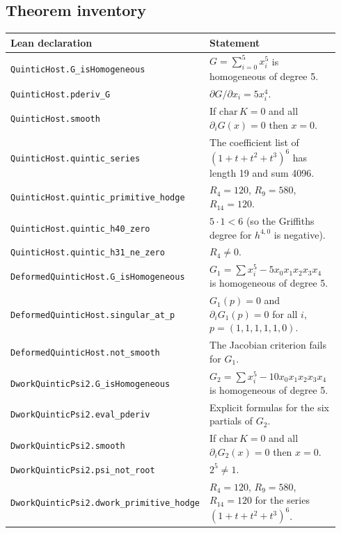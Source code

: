 \documentclass[11pt]{article}
\theoremstyle{definition}\newtheorem{definition}[theorem]{Definition}\newtheorem{remark}[theorem]{Remark}
\begin{document}
\subsection{Theorem inventory}
\begin{center}\small
\begin{longtable}{p{0.42\linewidth}p{0.52\linewidth}}
\toprule
Lean declaration & Statement\\\midrule
\texttt{QuinticHost.G\_isHomogeneous} & $G=\sum_{i=0}^5 x_i^5$ is homogeneous of degree 5.\\
\texttt{QuinticHost.pderiv\_G} & $\partial G/\partial x_i = 5x_i^4$.\\
\texttt{QuinticHost.smooth} & If $\mathrm{char}\,K=0$ and all $\partial_iG(x)=0$ then $x=0$.\\
\texttt{QuinticHost.quintic\_series} & The coefficient list of $(1+t+t^2+t^3)^6$ has length 19 and sum 4096.\\
\texttt{QuinticHost.quintic\_primitive\_hodge} & $R_4=120$, $R_9=580$, $R_{14}=120$.\\
\texttt{QuinticHost.quintic\_h40\_zero} & $5\cdot 1<6$ (so the Griffiths degree for $h^{4,0}$ is negative).\\
\texttt{QuinticHost.quintic\_h31\_ne\_zero} & $R_4\neq 0$.\\
\texttt{DeformedQuinticHost.G\_isHomogeneous} & $G_1=\sum x_i^5-5x_0x_1x_2x_3x_4$ is homogeneous of degree 5.\\
\texttt{DeformedQuinticHost.singular\_at\_p} & $G_1(p)=0$ and $\partial_iG_1(p)=0$ for all $i$, $p=(1,1,1,1,1,0)$.\\
\texttt{DeformedQuinticHost.not\_smooth} & The Jacobian criterion fails for $G_1$.\\
\texttt{DworkQuinticPsi2.G\_isHomogeneous} & $G_2=\sum x_i^5-10x_0x_1x_2x_3x_4$ is homogeneous of degree 5.\\
\texttt{DworkQuinticPsi2.eval\_pderiv} & Explicit formulas for the six partials of $G_2$.\\
\texttt{DworkQuinticPsi2.smooth} & If $\mathrm{char}\,K=0$ and all $\partial_iG_2(x)=0$ then $x=0$.\\
\texttt{DworkQuinticPsi2.psi\_not\_root} & $2^5\neq 1$.\\
\texttt{DworkQuinticPsi2.dwork\_primitive\_hodge} & $R_4=120$, $R_9=580$, $R_{14}=120$ for the series $(1+t+t^2+t^3)^6$.\\
\bottomrule
\end{longtable}\end{center}
\end{document}
